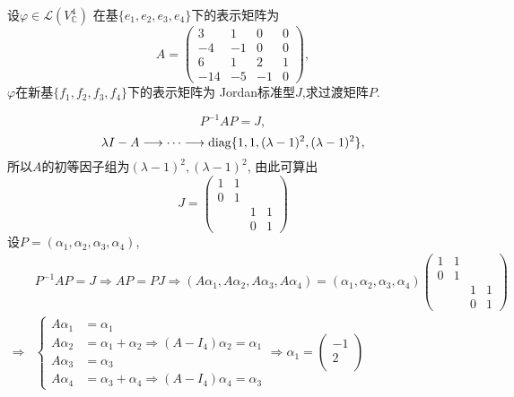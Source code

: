 \begin{example}\label{exl:JD3}
  设$\varphi\in \mathcal{L}(V^4_{\mathbb{C}})$
  在基$\{e_1,e_2,e_3,e_4\}$下的表示矩阵为
  \[A=
    \begin{pmatrix}
      3&1&0&0\\
      -4&-1&0&0\\
      6&1&2&1\\
      -14&-5&-1&0
    \end{pmatrix},\]
  $\varphi$在新基$\{f_1,f_2,f_3,f_4\}$下的表示矩阵为
  Jordan标准型$J$,求过渡矩阵$P$.
\end{example}
\begin{solution}
  \[P^{-1}AP=J,\]
  \[\lambda I-A \longrightarrow \cdots
    \longrightarrow \operatorname{diag}\{1,1,(\lambda-1)^2,(\lambda-1)^2\},\]
  所以$A$的初等因子组为$(\lambda-1)^2,(\lambda-1)^2$,
  由此可算出
  \[J=
    \begin{pmatrix}
      1&1&&\\
      0&1&&\\
       &&1&1\\
      &&0&1
    \end{pmatrix}
  \]
  设$P=(\alpha_1,\alpha_2,\alpha_3,\alpha_4)$,
  \begin{align*}
    & P^{-1}AP=J \Longrightarrow AP=PJ \Longrightarrow
    (A\alpha_1,A\alpha_2,A\alpha_3,A\alpha_4)=
    (\alpha_1,\alpha_2,\alpha_3,\alpha_4)
    \begin{pmatrix}
            1&1&&\\
      0&1&&\\
       &&1&1\\
      &&0&1
    \end{pmatrix}\\
    \Longrightarrow &
                      \left\{
                      \begin{aligned}
    A\alpha_1& =\alpha_1\\
    A\alpha_2& =\alpha_1+\alpha_2 \Longrightarrow
                        (A-I_4)\alpha_2=\alpha_1\\
    A\alpha_3& =\alpha_3\\
    A\alpha_4& =\alpha_3+\alpha_4 \Longrightarrow
                        (A-I_4)\alpha_4=\alpha_3
                      \end{aligned}
                      \right.   \Longrightarrow
   \alpha_1=
                      \begin{pmatrix}
                        -1\\
                        2\\

\end{pmatrix}
\end{align*}
\end{solution}
